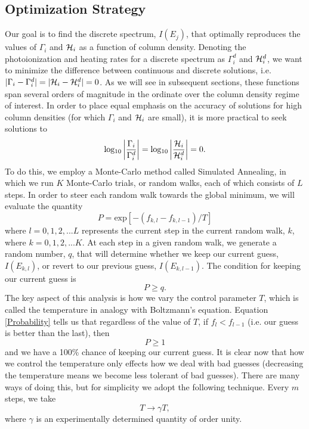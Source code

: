 \documentclass[preprint2]{aastex}              %
\begin{document}
\subsection{Optimization Strategy}
Our goal is to find the discrete spectrum, $I(E_j)$, that optimally reproduces the values of $\Gamma_i$ and $\mathcal{H}_i$ as a function of column density.  Denoting the photoionization and heating rates for a discrete spectrum as $\Gamma_i^d$ and $\mathcal{H}_i^d$, we want to minimize the difference between continuous and discrete solutions, i.e. $|\Gamma_i - \Gamma_i^d| = |\mathcal{H}_i - \mathcal{H}_i^d| = 0$.  As we will see in subsequent sections, these functions span several orders of magnitude in the ordinate over the column density regime of interest.  In order to place equal emphasis on the accuracy of solutions for high column densities (for which $\Gamma_i$ and $\mathcal{H}_i$ are small), it is more practical to seek solutions to
\begin{equation}
    \mathrm{log_{10}}\left | \frac{\Gamma_i}{\Gamma_i^d}\right | = \mathrm{log_{10}}\left | \frac{\mathcal{H}_i}{\mathcal{H}_i^d}\right | = 0 .
\end{equation}    
To do this, we employ a Monte-Carlo method called Simulated Annealing, in which we run $K$ Monte-Carlo trials, or random walks, each of which consists of $L$ steps.  In order to steer each random walk towards the global minimum, we will evaluate the quantity  
\begin{equation}
    P = \mathrm{exp}\left[-(f_{k,l} - f_{k,l-1}) / T \right]  \label{Probability}
\end{equation}
where $l=0,1,2,...L$ represents the current step in the current random walk, $k$, where $k = 0,1,2,...K$.  At each step in a given random walk, we generate a random number, $q$, that will determine whether we keep our current guess, $I(E_{k,l})$, or revert to our previous guess, $I(E_{k,l-1})$.  The condition for keeping our current guess is
\begin{equation}
    P \ge q .
\end{equation}
The key aspect of this analysis is how we vary the control parameter $T$, which is called the temperature in analogy with Boltzmann's equation.  Equation \ref{Probability} tells us that regardless of the value of $T$, if $f_l < f_{l-1}$ (i.e. our guess is better than the last), then
\begin{equation}
    P \ge 1
\end{equation}
and we have a 100\% chance of keeping our current guess.  It is clear now that how we control the temperature only effects how we deal with bad guesses (decreasing the temperature means we become less tolerant of bad guesses).  There are many ways of doing this, but for simplicity we adopt the following technique.  Every $m$ steps, we take
\begin{equation}
    T \rightarrow \gamma T ,
\end{equation}
where $\gamma$ is an experimentally determined quantity of order unity.
\end{document}
